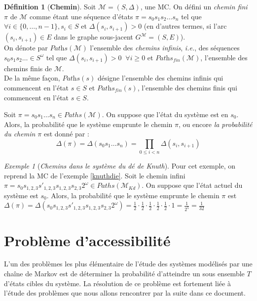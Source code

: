 \documentclass[12pt,a4paper]{report}
\theoremstyle{definition}%
\newtheorem{definition}{Définition}[chapter]
\theoremstyle{remark}
\newtheorem{example}{Exemple}[chapter]
\newcommand{\ie}{\textit{i.e.}, }
\begin{document}
\begin{definition}[\textbf{Chemin}]
	Soit $\mathcal{M} = (S, \Delta)$, une MC. On défini un \textit{chemin fini} $\pi$ de $\mathcal{M}$ comme étant une séquence d'états $\pi = s_0 s_1 s_2 \dots s_n$ tel que $\forall i \in \{0, \dots, n-1\}, s_i \in S$ et $\Delta(s_i, s_{i+1}) > 0$ (en d'autres termes, si l'arc $(s_i, s_{i+1}) \in E$ dans le graphe sous-jacent $G^\mathcal{M} = (S, E)$).
	\\
	On dénote par $\textit{Paths}(\mathcal{M})$ l'ensemble des \textit{chemins infinis}, \ie des séquences $s_0 s_1 s_2 \dots \in S^\omega$ tel que $\Delta(s_i, s_{i+1}) > 0 \;\;\forall i \geq 0$ et $\textit{Paths}_\textit{fin}(\mathcal{M})$, l'ensemble des chemins finis de $\mathcal{M}$.\\
	De la même façon, $\textit{Paths}(s)$ désigne l'ensemble des chemins infinis qui commencent en l'état $s \in S$ et $\textit{Paths}_\textit{fin}(s)$, l'ensemble des chemins finis qui commencent en l'état $s \in S$.
\end{definition}

Soit $\pi = s_0 s_1 \dots s_n \in Paths(\mathcal{M})$. On suppose que l'état du système est en $s_0$.
Alors, la probabilité que le système emprunte le chemin $\pi$, ou encore \textit{la probabilité du chemin $\pi$} est donné par : 
\[ \Delta(\pi) = \Delta(s_0 s_1 \dots s_n) = \prod_{0 \leq i < n} \Delta(s_i, s_{i+1}) \]

\begin{example}[\textit{Chemins dans le système du dé de Knuth}]
	Pour cet exemple, on reprend la MC de l'exemple \ref{knuthdie}. Soit le chemin infini $\pi = s_0 s_{1,2,3} s'_{1, 2, 3} s_{1,2,3} s_{2,3} 2^\omega \in Paths(\mathcal{M}_{Kd})$.
	On suppose que l'état actuel du système est $s_0$. Alors, la probabilité que le système emprunte le chemin $\pi$ est $\Delta(\pi) = \Delta(s_0 s_{1,2,3} s'_{1, 2, 3} s_{1,2,3} s_{2,3} 2^\omega) = \frac{1}{2} \cdot \frac{1}{2} \cdot \frac{1}{2} \cdot \frac{1}{2} \cdot \frac{1}{2} \cdot 1 = \frac{1}{2^5} = \frac{1}{32}$
\end{example}

\section{Problème d'accessibilité}

L'un des problèmes les plus élémentaire de l'étude des systèmes modélisés par une chaîne de Markov est de déterminer la probabilité d'atteindre un sous ensemble $T$ d'états cibles du système. La résolution de ce problème est fortement liée à l'étude des problèmes que nous allons rencontrer par la suite dans ce document.
\end{document}
